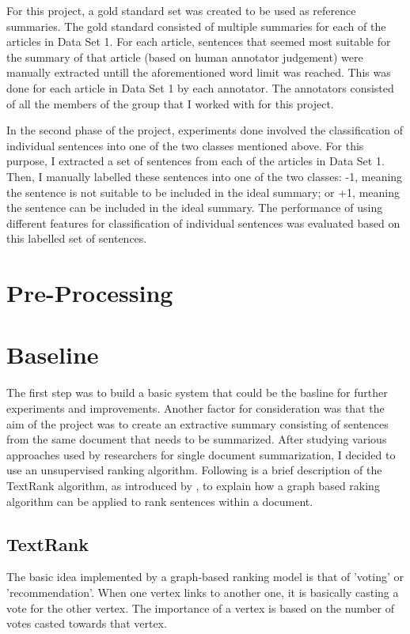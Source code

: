 For this project, a gold standard set was created to be used as reference summaries.
The gold standard consisted of multiple summaries for each of the articles in Data Set 1.
For each article, sentences that seemed most suitable for the summary of that article (based on human annotator judgement) were manually extracted untill the aforementioned word limit was reached.
This was done for each article in Data Set 1 by each annotator.
The annotators consisted of all the members of the group that I worked with for this project.

In the second phase of the project, experiments done involved the classification of individual sentences into one of the two classes mentioned above.
For this purpose, I extracted a set of sentences from each of the articles in Data Set 1.
Then, I manually labelled these sentences into one of the two classes: -1, meaning the sentence is not suitable to be included in the ideal summary; or +1, meaning the sentence can be included in the ideal summary.
The performance of using different features for classification of individual sentences was evaluated based on this labelled set of sentences.

\section{Pre-Processing}

\section{Baseline}
The first step was to build a basic system that could be the basline for further experiments and improvements.
Another factor for consideration was that the aim of the project was to create an extractive summary consisting of sentences from the same document that needs to be summarized.
After studying various approaches used by researchers for single document summarization, I decided to use an unsupervised ranking algorithm.
Following is a brief description of the TextRank algorithm, as introduced by \cite{Mihalcea et. al.[]}, to explain how a graph based raking algorithm can be applied to rank sentences within a document.

\subsection{TextRank}
The basic idea implemented by a graph-based ranking model is that of 'voting' or 'recommendation'.
When one vertex links to another one, it is basically casting a vote for the other vertex.
The importance of a vertex is based on the number of votes casted towards that vertex. 

